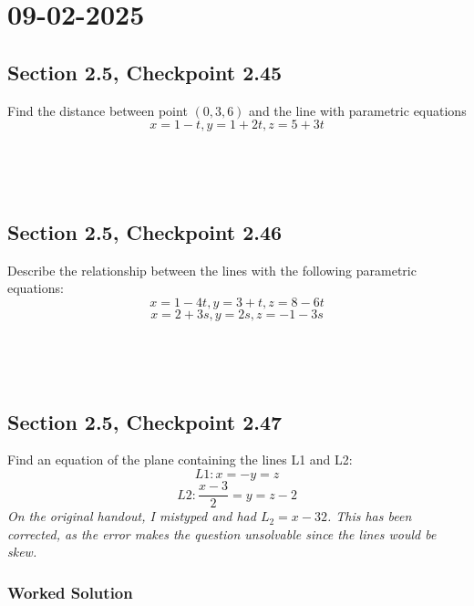 \documentclass[]{mangos-musings}
\begin{document}
\newpage
\section{09-02-2025}
\subsection{Section 2.5, Checkpoint 2.45}
Find the distance between point $(0,3,6)$ and the line with parametric equations 
\[x=1-t,y=1+2t,z=5+3t\]
\begin{align*}
  \\ 
  \\ 
  \\ 
  \\
  \\
  \\
  \\
  \\
  \\
  \\
\end{align*}


\subsection{Section 2.5, Checkpoint 2.46}
Describe the relationship between the lines with the following parametric equations:
\[x=1-4t,y=3+t,z=8-6t\]
\[x=2+3s,y=2s,z=-1-3s\]
\begin{align*}
  \\ 
  \\ 
  \\
  \\
  \\
  \\
  \\ 
  \\
  \\
  \\
\end{align*}

\subsection{Section 2.5, Checkpoint 2.47}
Find an equation of the plane containing the lines L1 and L2:
\[L1:x=-y=z\]
\[L2:\frac{x-3}{2}=y=z-2\]
\textit{On the original handout, I mistyped and had $L_2 = x - 32$. This has been corrected, as the error makes the question unsolvable since the lines would be skew.}

\subsubsection*{Worked Solution}
\end{document}
